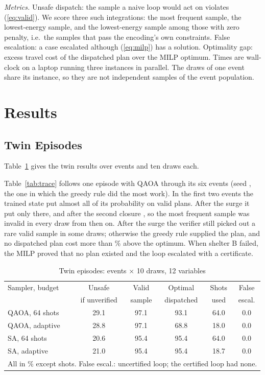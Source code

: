 \documentclass[conference]{IEEEtran}
\begin{document}
\textit{Metrics.} Unsafe dispatch: the sample a naive loop would act on violates (\ref{eq:valid}). We score three such integrations: the most frequent sample, the lowest-energy sample, and the lowest-energy sample among those with zero penalty, i.e.\ the samples that pass the encoding's own constraints. False escalation: a case escalated although (\ref{eq:milp}) has a solution. Optimality gap: excess travel cost of the dispatched plan over the MILP optimum. Times are wall-clock on a laptop running three instances in parallel. The draws of one event share its instance, so they are not independent samples of the event population.

\section{Results}
\subsection{Twin Episodes}
Table~\ref{tab:twin} gives the twin results over \TwinEvents{} events and ten draws each. \TwinText{} \StatText{}

Table~\ref{tab:trace} follows one episode with QAOA through its six events (seed \TraceSeedNo, the one in which the greedy rule did the most work). In the first two events the trained state put almost all of its probability on valid plans. After the surge it put only \TracePfTwo{} there, and after the second closure \TracePfThree{}, so the most frequent sample was invalid in every draw from then on. After the surge the verifier still picked out a rare valid sample in some draws; otherwise the greedy rule supplied the plan, and no dispatched plan cost more than \TraceGreedyGap\% above the optimum. When shelter B failed, the MILP proved that no plan existed and the loop escalated with a certificate.



\begin{table}[t]
\caption{Twin episodes: \TwinEvents{} events $\times$ 10 draws, 12 variables}
\label{tab:twin}
\centering
\footnotesize
\setlength{\tabcolsep}{2.2pt}
\begin{tabular}{lccccc}
\toprule
Sampler, budget & Unsafe & Valid & Optimal & Shots & False\\
 & if unverified & sample & dispatched & used & escal.\\
\midrule
QAOA, 64 shots & 29.1 & 97.1 & 93.1 & 64.0 & 0.0\\
QAOA, adaptive & 28.8 & 97.1 & 68.8 & 18.0 & 0.0\\
SA, 64 shots & 20.6 & 95.4 & 95.4 & 64.0 & 0.0\\
SA, adaptive & 21.0 & 95.4 & 95.4 & 18.7 & 0.0\\
\bottomrule
\multicolumn{6}{l}{\scriptsize All in \% except shots. False escal.: uncertified loop; the certified loop had none.}\\
\end{tabular}
\end{table}
\end{document}
